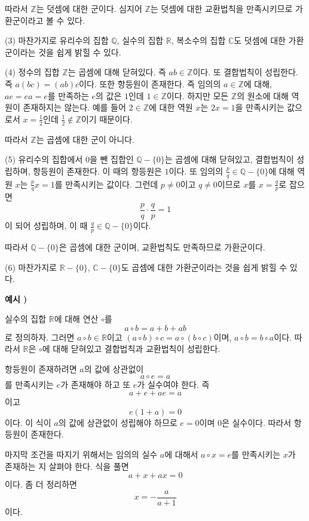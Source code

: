 \documentclass{article}
\newcounter{num}
\newcommand{\exam}[1]
{\bigskip\noindent\refstepcounter{num}\textbf{예시 \arabic{num}) #1}\par}
\begin{document}
따라서 \(\mathbb Z\)는 덧셈에 대한 군이다.
심지어 \(\mathbb Z\)는 덧셈에 대한 교환법칙을 만족시키므로 가환군이라고 볼 수 있다.
\medskip

(3)
마찬가지로 유리수의 집합 \(\mathbb Q\), 실수의 집합 \(\mathbb R\), 복소수의 집합 \(\mathbb C\)도 덧셈에 대한 가환군이라는 것을 쉽게 밝힐 수 있다.
\medskip

(4)
정수의 집합 \(\mathbb Z\)는 곱셈에 대해 닫혀있다.
즉 \(ab\in\mathbb Z\)이다.
또 결합법칙이 성립한다.
즉 \(a(bc)=(ab)c\)이다.
또한 항등원이 존재한다.
즉 임의의 \(a\in\mathbb Z\)에 대해, \(ae=ea=e\)를 만족하는 \(e\)의 값은 \(1\)인데 \(1\in\mathbb Z\)이다.
하지만 모든 \(\mathbb Z\)의 원소에 대해 역원이 존재하지는 않는다.
예를 들어 \(2\in\mathbb Z\)에 대한 역원 \(x\)는 \(2x=1\)을 만족시키는 값으로서 \(x=\frac12\)인데 \(\frac12\not\in\mathbb Z\)이기 때문이다.

따라서 \(\mathbb Z\)는 곱셈에 대한 군이 아니다.
\medskip

(5)
유리수의 집합에서 0을 뺀 집합인 \(\mathbb Q-\{0\}\)는 곱셈에 대해 닫혀있고, 결합법칙이 성립하며, 항등원이 존재한다.
이 때의 항등원은 \(1\)이다.
또 임의의 \(\frac pq\in\mathbb Q-\{0\}\)에 대해 역원 \(x\)는 \(\frac pqx=1\)를 만족시키는 값이다.
그런데 \(p\neq0\)이고 \(q\neq0\)이므로 \(x\)를 \(x=\frac qp\)로 잡으면
\[\frac pq\cdot\frac qp=1\]
이 되어 성립하며, 이 때 \(\frac qp\in\mathbb Q-\{0\}\)이다.

따라서 \(\mathbb Q-\{0\}\)은 곱셈에 대한 군이며, 교환법칙도 만족하므로 가환군이다.
\medskip


(6)
마찬가지로 \(\mathbb R-\{0\}\), \(\mathbb C-\{0\}\)도 곱셈에 대한 가환군이라는 것을 쉽게 밝힐 수 있다.

%
\exam{}
실수의 집합 \(\mathbb R\)에 대해 연산 \(\circ\)를
\[a\circ b=a+b+ab\]
로 정의하자.
그러면 \(a\circ b\in\mathbb R\)이고 \((a\circ b)\circ c=a\circ(b\circ c)\)이며, \(a\circ b=b\circ a\)이다.
따라서 \(\mathbb R\)은 \(\circ\)에 대해 닫혀있고 결합법칙과 교환법칙이 성립한다.

항등원이 존재하려면 \(a\)의 값에 상관없이
\[a\circ e=a\]
를 만족시키는 \(e\)가 존재해야 하고 또 \(e\)가 실수여야 한다.
즉
\[a+e+ae=a\]
이고
\[e(1+a)=0\]
이다.
이 식이 \(a\)의 값에 상관없이 성립해야 하므로 \(e=0\)이며 \(0\)은 실수이다.
따라서 항등원이 존재한다.

마지막 조건을 따지기 위해서는 임의의 실수 \(a\)에 대해서 \(a\circ x=e\)를 만족시키는 \(x\)가 존재하는 지 살펴야 한다.
식을 풀면
\[a+x+ax=0\]
이다.
좀 더 정리하면
\[x=-\frac{a}{a+1}\]
이다.
\end{document}
